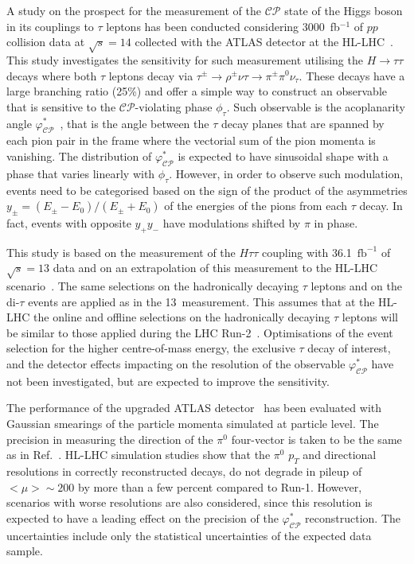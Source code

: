 \documentclass[../report.tex]{subfiles}
\begin{document}
A study on the prospect for the measurement of the $\mathcal{CP}$ state of the Higgs boson in its couplings to $\tau$ leptons has been conducted considering 3000~fb$^{-1}$ of $pp$ collision data at $\sqrt{s}=14$ \UTeV collected with the ATLAS detector at the HL-LHC~\cite{ATL-PHYS-PUB-2019-008}. This study investigates the sensitivity for such measurement utilising the $H\to\tau\tau$ decays where both $\tau$ leptons decay via $\tau^{\pm}\to\rho^{\pm}\nu\tau\to\pi^{\pm}\pi^0\nu_\tau$. These decays have a large branching ratio (25\%) and offer a simple way to construct an observable that is sensitive to the $\mathcal{CP}$-violating phase $\phi_\tau$. Such observable is the acoplanarity angle $\varphi ^*_{\mathcal{CP}}$~\cite{Desch:2003rw}, that is the angle between the $\tau$ decay planes that are spanned by each pion pair in the frame where the vectorial sum of the pion momenta is vanishing. The distribution of $\varphi ^*_{\mathcal{CP}}$ is expected to have sinusoidal shape with a phase that varies linearly with $\phi_\tau$. However, in order to observe such modulation, events need to be categorised based on the sign of the product of the asymmetries $y_{\pm} = (E_{\pm}-E_0)/(E_{\pm}+E_0)$ of the energies of the pions from each $\tau$ decay. In fact, events with opposite $y_{+}y_{-}$ have modulations shifted by $\pi$ in phase.

This study is based on the measurement of the $H\tau\tau$ coupling with 36.1~$\mathrm{fb}^{-1}$ of $\sqrt{s}=13$ \UTeV data \cite{Aaboud:2018pen} and on an extrapolation of this measurement to the HL-LHC scenario~\cite{ATL-PHYS-PUB-2018-054}. The same selections on the hadronically decaying $\tau$ leptons and on the di-$\tau$ events are applied as in the 13~\UTeV measurement. This assumes that at the HL-LHC the online and offline selections on the hadronically decaying $\tau$ leptons will be similar to those applied during the LHC Run-2~\cite{Collaboration:2285584}. Optimisations of the event selection for the higher centre-of-mass energy, the exclusive $\tau$ decay of interest, and the detector effects impacting on the resolution of the observable $\varphi ^*_{\mathcal{CP}}$ have not been investigated, but are expected to improve the sensitivity. 

The performance of the upgraded ATLAS detector~\cite{Collaboration:2285585} has been evaluated with Gaussian smearings of the particle momenta simulated at particle level.
The precision in measuring the direction of the $\pi^{0}$ four-vector is taken to be the same as in Ref.~\cite{Aad:2015unr}. HL-LHC simulation studies show that the $\pi^{0}$ $p_{T}$ and directional resolutions in correctly reconstructed decays, do not degrade in pileup of $<\mu>\sim200$ by more than a few percent compared to Run-1. However, scenarios with worse resolutions are also considered, since this resolution is expected to have a leading effect on the precision of the $\varphi ^*_{\mathcal{CP}}$ reconstruction.
The uncertainties include only the statistical uncertainties of the expected data sample.
\end{document}
